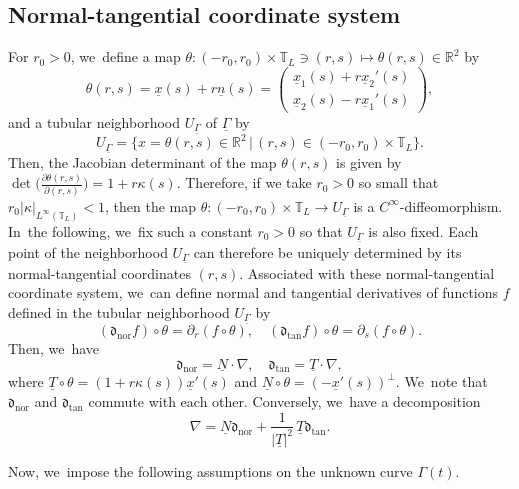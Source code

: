 \documentclass[11pt]{article}
\newcommand{\dtan}{{\mathfrak d}_\mathrm{tan}}
\newcommand{\dnor}{{\mathfrak d}_\mathrm{nor}}
\newcommand{\R}{{\mathbb R}}
\newcommand{\ul}[1]{\underline{#1}}
\newcommand{\itGamma}{\mathit{\Gamma}}
\theoremstyle{definition}
\begin{document}
\subsection{Normal-tangential coordinate system}\label{subsect:NTCS}
For $r_0>0$, we~define a map $\theta: (-r_0,r_0)\times\mathbb{T}_L\ni(r,s) \mapsto \theta(r,s)\in\R^2$ by
\begin{equation}\label{diffeo-theta}
\theta(r,s) = \ul{x}(s) + r\ul{n}(s) =
\begin{pmatrix}
\ul{x}_1(s) + r\ul{x}_2'(s) \\
\ul{x}_2(s) - r\ul{x}_1'(s)
\end{pmatrix},
\end{equation}
and a tubular neighborhood $U_{\ul{\itGamma}}$ of $\ul{\itGamma}$ by
\[
U_{\ul{\itGamma}} = \bigl\{ x=\theta(r,s)\in\R^2 \,|\, (r,s)\in (-r_0,r_0)\times\mathbb{T}_L \bigr\}.
\]
Then, the Jacobian determinant of the map $\theta(r,s)$ is given by $\det\bigl(\frac{\partial\theta(r,s)}{\partial(r,s)} \bigr) = 1+r\kappa(s)$.
Therefore, if we take $r_0>0$ so small that $r_0 |\kappa|_{L^\infty(\mathbb{T}_L)}<1$,
then the map \hbox{$\theta: (-r_0,r_0)\times\mathbb{T}_L \to U_{\ul{\itGamma}}$} is a $C^\infty$-diffeomorphism. In~the following, we~fix such a constant $r_0>0$ so that $U_{\ul{\itGamma}}$ is also fixed.
Each point of the neighborhood $U_{\ul{\itGamma}}$ can therefore be uniquely determined by its normal-tangential coordinates $(r, s)$.
Associated with these normal-tangential coordinate system, we~can define normal and tangential derivatives of functions $f$ defined in the tubular neighborhood $U_{\ul{\itGamma}}$ by
\begin{equation}\label{NorTanD}
(\dnor f)\circ\theta = \partial_r(f\circ\theta), \quad
(\dtan f)\circ\theta = \partial_s(f\circ\theta).
\end{equation}
Then, we~have
\begin{equation}\label{NorTanD2}
\dnor = \ul{N}\cdot\nabla,\quad
\dtan = \ul{T}\cdot\nabla,
\end{equation}
where $\ul{T}\circ\theta = (1+r\kappa(s))\ul{x}'(s)$ and $\ul{N}\circ\theta = (-\ul{x}'(s))^\perp$. We~note that $\dnor$ and $\dtan$ commute with each other.
Conversely, we~have a decomposition
\begin{equation}\label{diff deco}
\nabla = \ul{N}\dnor + \frac{1}{|\ul{T}|^2}\,{\ul{T}}\dtan.
\end{equation}

Now, we~impose the following assumptions on the unknown curve $\itGamma(t)$.
\end{document}
